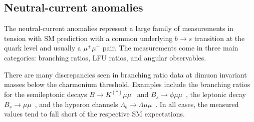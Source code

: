 \subsection{Neutral-current anomalies}
\label{sec:ch1-neutral-current-anomalies}

The neutral-current anomalies represent a large family of measurements in
tension with SM prediction with a common underlying $b\to s$ transition at the
quark level and usually a $\mu^{+}\mu^{-}$ pair. The measurements come in three
main categories: branching ratios, LFU ratios, and angular observables.

There are many discrepancies seen in branching ratio data at dimuon invariant
masses below the charmonium threshold. Examples include the branching ratios for
the semileptonic decays $B \to K^{(*)} \mu\mu$~\cite{Aaij:2014pli} and
$B_{s} \to \phi \mu\mu$~\cite{Aaij:2015esa}, the leptonic decay
$B_{s} \to \mu\mu$~\cite{CMS-PAS-BPH-16-004, Aaij:2012nna, Aaij:2017vad,
  Aaboud:2018mst}, and the hyperon channels
$\Lambda_{b} \to \Lambda \mu\mu$~\cite{Aaij:2015xza}. In all cases, the measured
values tend to fall short of the respective SM expectations.


